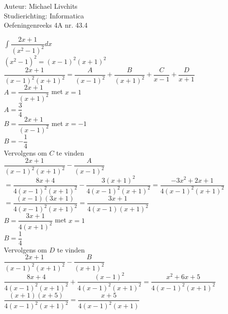 \documentclass[a4paper]{article}
\begin{document}
  
\noindent \large Auteur: Michael Livchits \\
\noindent \large Studierichting: Informatica\\
\noindent \large Oefeningenreeks 4A nr. 43.4\\

\medskip

\normalsize

$\displaystyle\int\dfrac{2x+1}{(x^2-1)^2}dx$\\

$(x^2-1)^2 = (x-1)^2(x+1)^2$\\

$\dfrac{2x+1}{(x-1)^2(x+1)^2} = \dfrac{A}{(x-1)^2}+\dfrac{B}{(x+1)^2}+\dfrac{C}{x-1}+\dfrac{D}{x+1}$\\

$A = \dfrac{2x+1}{(x+1)^2}$ met $x = 1$\\

$A = \dfrac{3}{4}$\\

$B = \dfrac{2x+1}{(x-1)^2}$ met $x = -1$\\

$B = -\dfrac{1}{4}$\\

Vervolgens om $C$ te vinden\\

$\dfrac{2x+1}{(x-1)^2(x+1)^2} - \dfrac{A}{(x-1)^2}$\\

$= \dfrac{8x+4}{4(x-1)^2(x+1)^2} - \dfrac{3(x+1)^2}{4(x-1)^2(x+1)^2} = \dfrac{-3x^2+2x+1}{4(x-1)^2(x+1)^2}$\\

$= \dfrac{(x-1)(3x+1)}{4(x-1)^2(x+1)^2} = \dfrac{3x+1}{4(x-1)(x+1)^2}$\\

$B = \dfrac{3x+1}{4(x+1)^2}$ met $x=1$\\

$B = \dfrac{1}{4}$\\

Vervolgens om $D$ te vinden\\

$\dfrac{2x+1}{(x-1)^2(x+1)^2} - \dfrac{B}{(x+1)^2}$\\

$\dfrac{8x+4}{4(x-1)^2(x+1)^2} + \dfrac{(x-1)^2}{4(x-1)^2(x+1)^2} = \dfrac{x^2+6x+5}{4(x-1)^2(x+1)^2}$\\

$\dfrac{(x+1)(x+5)}{4(x-1)^2(x+1)^2} = \dfrac{x+5}{4(x-1)^2(x+1)}$\\
\end{document}
